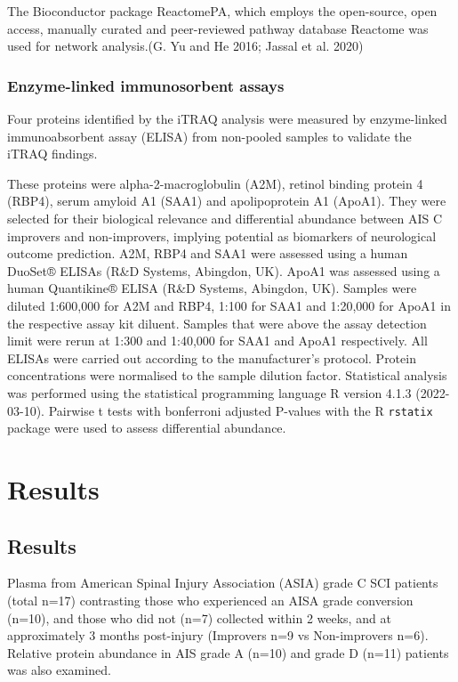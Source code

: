 \documentclass[9pt,lineno]{elife}
\begin{document}
The Bioconductor package ReactomePA, which employs the open-source, open access, manually curated and peer-reviewed pathway database Reactome was used for network analysis.(G. Yu and He 2016; Jassal et al. 2020)

\hypertarget{enzyme-linked-immunosorbent-assays}{%
\subsubsection{Enzyme-linked immunosorbent assays}\label{enzyme-linked-immunosorbent-assays}}

Four proteins identified by the iTRAQ analysis were measured by enzyme-linked immunoabsorbent assay (ELISA) from non-pooled samples to validate the iTRAQ findings.

These proteins were alpha-2-macroglobulin (A2M), retinol binding protein 4 (RBP4), serum amyloid A1 (SAA1) and apolipoprotein A1 (ApoA1).
They were selected for their biological relevance and differential abundance between AIS C improvers and non-improvers, implying potential as biomarkers of neurological outcome prediction.
A2M, RBP4 and SAA1 were assessed using a human DuoSet® ELISAs (R\&D Systems, Abingdon, UK).
ApoA1 was assessed using a human Quantikine® ELISA (R\&D Systems, Abingdon, UK).
Samples were diluted 1:600,000 for A2M and RBP4, 1:100 for SAA1 and 1:20,000 for ApoA1 in the respective assay kit diluent.
Samples that were above the assay detection limit were rerun at 1:300 and 1:40,000 for SAA1 and ApoA1 respectively.
All ELISAs were carried out according to the manufacturer's protocol.
Protein concentrations were normalised to the sample dilution factor.
Statistical analysis was performed using the statistical programming language R version 4.1.3 (2022-03-10).
Pairwise t tests with bonferroni adjusted P-values with the R \texttt{rstatix} package were used to assess differential abundance.

\clearpage

\hypertarget{results}{%
\section{Results}\label{results}}

\hypertarget{chap-3-results}{%
\subsection{Results}\label{chap-3-results}}

Plasma from American Spinal Injury Association (ASIA) grade C SCI patients (total n=17) contrasting those who experienced an AISA grade conversion (n=10), and those who did not (n=7) collected within 2 weeks, and at approximately 3 months post-injury (Improvers n=9 vs Non-improvers n=6).
Relative protein abundance in AIS grade A (n=10) and grade D (n=11) patients was also examined.
\end{document}
